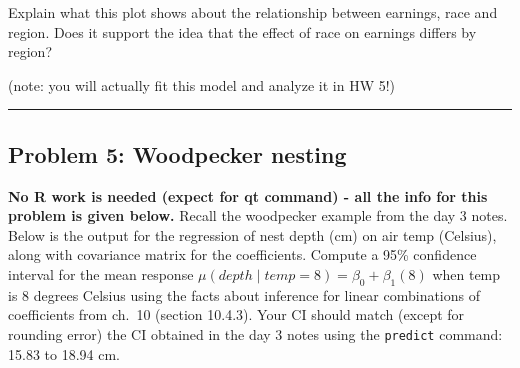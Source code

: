 \documentclass[
]{article}
\begin{document}
Explain what this plot shows about the relationship between earnings,
race and region. Does it support the idea that the effect of race on
earnings differs by region?

(note: you will actually fit this model and analyze it in HW 5!)

\begin{center}\rule{0.5\linewidth}{0.5pt}\end{center}

\hypertarget{problem-5-woodpecker-nesting}{%
\subsection{Problem 5: Woodpecker
nesting}\label{problem-5-woodpecker-nesting}}

\textbf{No R work is needed (expect for qt command) - all the info for
this problem is given below.} Recall the woodpecker example from the day
3 notes. Below is the output for the regression of nest depth (cm) on
air temp (Celsius), along with covariance matrix for the coefficients.
Compute a 95\% confidence interval for the mean response
\(\mu(depth \mid temp=8)=\beta_0 + \beta_1(8)\) when temp is 8 degrees
Celsius using the facts about inference for linear combinations of
coefficients from ch.~10 (section 10.4.3). Your CI should match (except
for rounding error) the CI obtained in the day 3 notes using the
\texttt{predict} command: 15.83 to 18.94 cm.
\end{document}
